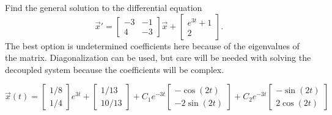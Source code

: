 \begin{exercise}
Find the general solution to the differential equation
\begin{equation*}
{\vec{x}}' = \begin{bmatrix} -3 & -1 \\ 4 & -3 \end{bmatrix} \vec{x} + \begin{bmatrix} e^{3t} + 1 \\ 2 \end{bmatrix}. 
\end{equation*}
The best option is undetermined coefficients here because of the eigenvalues of the matrix. Diagonalization can be used, but care will be needed with solving the decoupled system because the coefficients will be complex. 
\end{exercise}
\comboSol{%
}
{%
$\vec{x}(t) = \left[\begin{smallmatrix} 1/8 \\ 1/4 \end{smallmatrix}\right]e^{3t} + \left[\begin{smallmatrix} 1/13 \\ 10/13 \end{smallmatrix}\right] + C_1e^{-3t}\left[\begin{smallmatrix} -\cos(2t) \\ -2\sin(2t) \end{smallmatrix}\right] + C_2e^{-3t}\left[\begin{smallmatrix} -\sin(2t) \\ 2\cos(2t) \end{smallmatrix}\right]$
}

